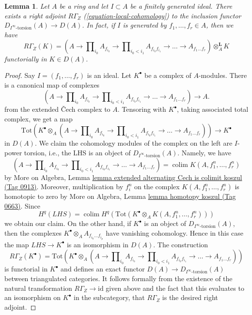 \documentclass{amsart}
\theoremstyle{plain}
\newtheorem{lemma}[subsection]{Lemma}
\theoremstyle{definition}
\theoremstyle{remark}
\numberwithin{equation}{subsection}
\def\colim{\mathop{\mathrm{colim}}\nolimits}
\begin{document}
\begin{lemma}
\label{lemma-local-cohomology-adjoint}
Let $A$ be a ring and let $I \subset A$ be a finitely generated ideal.
There exists a right adjoint $R\Gamma_Z$ (\ref{equation-local-cohomology})
to the inclusion functor $D_{I^\infty\text{-torsion}}(A) \to D(A)$.
In fact, if $I$ is generated by $f_1, \ldots, f_r \in A$, then we have
$$
R\Gamma_Z(K) =
(A \to \prod\nolimits_{i_0} A_{f_{i_0}} \to
\prod\nolimits_{i_0 < i_1} A_{f_{i_0}f_{i_1}}
\to \ldots \to A_{f_1\ldots f_r}) \otimes_A^\mathbf{L} K
$$
functorially in $K \in D(A)$.
\end{lemma}

\begin{proof}
Say $I = (f_1, \ldots, f_r)$ is an ideal.
Let $K^\bullet$ be a complex of $A$-modules.
There is a canonical map of complexes
$$
(A \to \prod\nolimits_{i_0} A_{f_{i_0}} \to
\prod\nolimits_{i_0 < i_1} A_{f_{i_0}f_{i_1}} \to
\ldots \to A_{f_1\ldots f_r}) \longrightarrow A.
$$
from the extended {\v C}ech complex to $A$.
Tensoring with $K^\bullet$, taking associated total complex,
we get a map
$$
\text{Tot}\left(
K^\bullet \otimes_A
(A \to \prod\nolimits_{i_0} A_{f_{i_0}} \to
\prod\nolimits_{i_0 < i_1} A_{f_{i_0}f_{i_1}} \to
\ldots \to A_{f_1\ldots f_r})\right)
\longrightarrow
K^\bullet
$$
in $D(A)$. We claim the cohomology modules of the complex on the left are
$I$-power torsion, i.e., the LHS is an object of
$D_{I^\infty\text{-torsion}}(A)$. Namely, we have
$$
(A \to \prod\nolimits_{i_0} A_{f_{i_0}} \to
\prod\nolimits_{i_0 < i_1} A_{f_{i_0}f_{i_1}} \to
\ldots \to A_{f_1\ldots f_r}) = \colim K(A, f_1^n, \ldots, f_r^n)
$$
by More on Algebra, Lemma
\href{https://stacks.math.columbia.edu/tag/0913}{lemma extended alternating Cech is colimit koszul (Tag 0913)}.
Moreover, multiplication by $f_i^n$ on the complex
$K(A, f_1^n, \ldots, f_r^n)$ is homotopic to zero by
More on Algebra, Lemma \href{https://stacks.math.columbia.edu/tag/0663}{lemma homotopy koszul (Tag 0663)}.
Since
$$
H^q\left( LHS \right) =
\colim H^q(\text{Tot}(K^\bullet \otimes_A K(A, f_1^n, \ldots, f_r^n)))
$$
we obtain our claim. On the other hand, if $K^\bullet$ is an
object of $D_{I^\infty\text{-torsion}}(A)$, then the complexes
$K^\bullet \otimes_A A_{f_{i_0} \ldots f_{i_p}}$ have vanishing
cohomology. Hence in this case the map $LHS \to K^\bullet$
is an isomorphism in $D(A)$. The construction
$$
R\Gamma_Z(K^\bullet) =
\text{Tot}\left(
K^\bullet \otimes_A
(A \to \prod\nolimits_{i_0} A_{f_{i_0}} \to
\prod\nolimits_{i_0 < i_1} A_{f_{i_0}f_{i_1}} \to
\ldots \to A_{f_1\ldots f_r})\right)
$$
is functorial in $K^\bullet$ and defines an exact functor
$D(A) \to D_{I^\infty\text{-torsion}}(A)$ between
triangulated categories. It follows formally from the
existence of the natural transformation $R\Gamma_Z \to \text{id}$
given above and the fact that this evaluates to an isomorphism
on $K^\bullet$ in the subcategory, that $R\Gamma_Z$ is the desired
right adjoint.
\end{proof}
\end{document}
